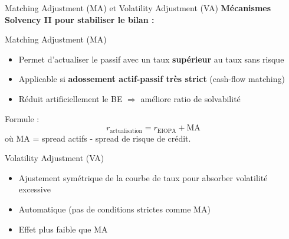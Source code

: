 \documentclass[10pt,aspectratio=169]{beamer}
\begin{document}
\begin{frame}{Matching Adjustment (MA) et Volatility Adjustment (VA)}
\textbf{Mécanismes Solvency II pour stabiliser le bilan :}

\begin{block}{Matching Adjustment (MA)}
\begin{itemize}
    \item Permet d'actualiser le passif avec un taux \textbf{supérieur} au taux sans risque
    \item Applicable si \textbf{adossement actif-passif très strict} (cash-flow matching)
    \item Réduit artificiellement le BE $\Rightarrow$ améliore ratio de solvabilité
\end{itemize}
Formule :
\[
r_{\text{actualisation}} = r_{\text{EIOPA}} + \text{MA}
\]
où MA = spread actifs - spread de risque de crédit.
\end{block}

\vspace{0.3cm}
\begin{block}{Volatility Adjustment (VA)}
\begin{itemize}
    \item Ajustement symétrique de la courbe de taux pour absorber volatilité excessive
    \item Automatique (pas de conditions strictes comme MA)
    \item Effet plus faible que MA
\end{itemize}
\end{block}
\end{frame}
\end{document}
